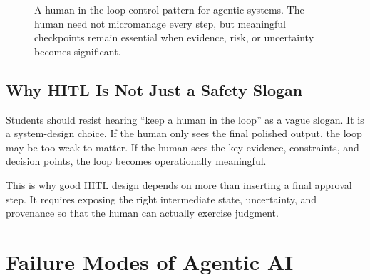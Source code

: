 \documentclass[12pt]{article}
\begin{document}
\begin{figure}[ht]
    \centering
    \caption{A human-in-the-loop control pattern for agentic systems. The human need not micromanage every step, but meaningful checkpoints remain essential when evidence, risk, or uncertainty becomes significant.}
\end{figure}

\subsection{Why HITL Is Not Just a Safety Slogan}

Students should resist hearing ``keep a human in the loop'' as a vague slogan. It is a system-design choice. If the human only sees the final polished output, the loop may be too weak to matter. If the human sees the key evidence, constraints, and decision points, the loop becomes operationally meaningful.

This is why good HITL design depends on more than inserting a final approval step. It requires exposing the right intermediate state, uncertainty, and provenance so that the human can actually exercise judgment.

\section{Failure Modes of Agentic AI}
\end{document}

